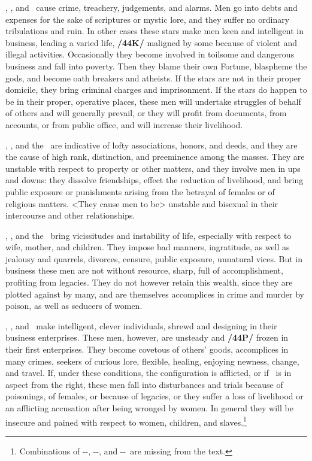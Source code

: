 \Saturn, \Mars, and \Mercury\, cause crime, treachery, judgements, and alarms. Men go into debts and expenses for the sake of scriptures or mystic lore, and they suffer no ordinary tribulations and ruin. In other cases these stars make men keen and intelligent in business, leading a varied life, \textbf{/44K/} maligned by some because of violent and illegal activities. Occasionally they become involved in toilsome and dangerous business and fall into poverty. Then they blame their own Fortune, blaspheme the gods, and become oath breakers and atheists. If the stars are not in their proper domicile, they bring criminal charges and imprisonment. If the stars do happen to be in their proper, operative places, these men will undertake struggles of behalf of others and will generally prevail, or they will profit from documents, from accounts, or from public office, and will increase their livelihood.

\Saturn, \Venus, and the \Sun\, are indicative of lofty associations, honors, and deeds, and they are the cause of high rank, distinction, and preeminence among the masses. They are unstable with respect to property or other matters, and they involve men in ups and downs: they dissolve friendships, effect the reduction of livelihood, and bring public exposure or punishments arising from the betrayal of females or of
religious matters. <They cause men to be> unstable and bisexual in their intercourse and other relationships.

\Saturn, \Venus, and the \Moon\, bring vicissitudes and instability of life, especially with respect to wife, mother, and children. They impose bad manners, ingratitude, as well as jealousy and quarrels, divorces, censure, public exposure, unnatural vices. But in business these men are not without resource, sharp, full of accomplishment, profiting from legacies. They do not however retain this wealth, since they are plotted against by many, and are themselves accomplices in crime and murder by poison, as well as seducers of women.

\Saturn, \Venus, and \Mercury\, make intelligent, clever individuals, shrewd and designing in their business enterprises. These men, however, are unsteady and \textbf{/44P/} frozen in their first enterprises. They become covetous of others’ goods, accomplices in many crimes, seekers of curious lore, flexible, healing, enjoying newness, change, and travel. If, under these conditions, the configuration is afflicted, or if \Mars\, is in aspect from the right, these men fall into disturbances and trials because of poisonings, of females, or because of legacies, or they suffer a loss of livelihood or an afflicting accusation after being wronged by women. In general they will be insecure and pained with respect to women, children, and slaves.\footnote{Combinations of \Saturn-\Mercury-\Sun, \Saturn-\Mercury-\Moon, and \Saturn-\Sun-\Moon\, are missing from the text.}

